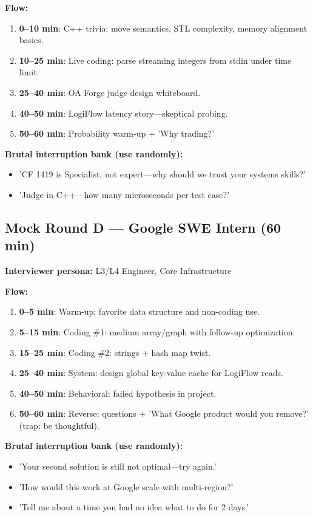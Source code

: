 \documentclass[9pt,a4paper]{article}
\begin{document}
\textbf{Flow:}
\begin{enumerate}
  \item \textbf{0--10 min}: C++ trivia: move semantics, STL complexity, memory alignment basics.
  \item \textbf{10--25 min}: Live coding: parse streaming integers from stdin under time limit.
  \item \textbf{25--40 min}: OA Forge judge design whiteboard.
  \item \textbf{40--50 min}: LogiFlow latency story---skeptical probing.
  \item \textbf{50--60 min}: Probability warm-up + 'Why trading?'
\end{enumerate}

\textbf{Brutal interruption bank (use randomly):}
\begin{itemize}
  \item 'CF 1419 is Specialist, not expert---why should we trust your systems skills?'
  \item 'Judge in C++---how many microseconds per test case?'
\end{itemize}

\subsection{Mock Round D --- Google SWE Intern (60 min)}
\textbf{Interviewer persona:} L3/L4 Engineer, Core Infrastructure

\textbf{Flow:}
\begin{enumerate}
  \item \textbf{0--5 min}: Warm-up: favorite data structure and non-coding use.
  \item \textbf{5--15 min}: Coding \#1: medium array/graph with follow-up optimization.
  \item \textbf{15--25 min}: Coding \#2: strings + hash map twist.
  \item \textbf{25--40 min}: System: design global key-value cache for LogiFlow reads.
  \item \textbf{40--50 min}: Behavioral: failed hypothesis in project.
  \item \textbf{50--60 min}: Reverse: questions + 'What Google product would you remove?' (trap: be thoughtful).
\end{enumerate}

\textbf{Brutal interruption bank (use randomly):}
\begin{itemize}
  \item 'Your second solution is still not optimal---try again.'
  \item 'How would this work at Google scale with multi-region?'
  \item 'Tell me about a time you had no idea what to do for 2 days.'
\end{itemize}
\end{document}
